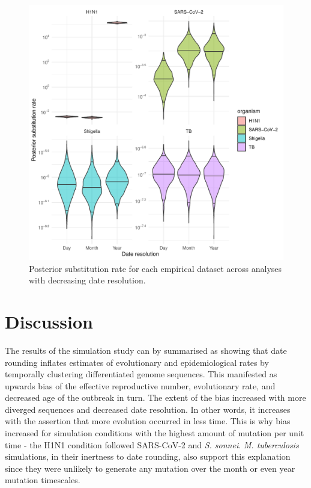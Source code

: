 \documentclass{article}
\begin{document}
\begin{spacing}{1.5}
\begin{figure}[h!]
    \centering
    \includegraphics{empirical_clock_trajectory.pdf}
    \caption{Posterior substitution rate for each empirical dataset across analyses with decreasing date resolution.}
    \label{fig:empClock}
\end{figure}

\section*{Discussion}

The results of the simulation study can by summarised as showing that date rounding inflates estimates of evolutionary and epidemiological rates by temporally clustering differentiated genome sequences. This manifested as upwards bias of the effective reproductive number, evolutionary rate, and decreased age of the outbreak in turn. The extent of the bias increased with more diverged sequences and decreased date resolution. In other words, it increases with the assertion that more evolution occurred in less time. This is why bias increased for simulation conditions with the highest amount of mutation per unit time - the H1N1 condition followed SARS-CoV-2 and \textit{S. sonnei}. \textit{M. tuberculosis} simulations, in their inertness to date rounding, also support this explanation since they were unlikely to generate any mutation over the month or even year mutation timescales.


\end{spacing}
\end{document}

